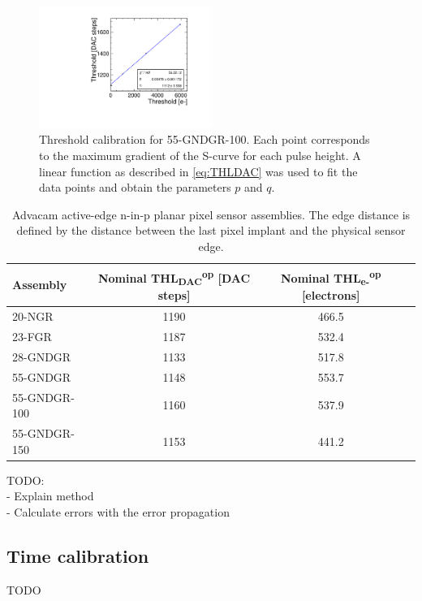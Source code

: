 \begin{figure}[htbp]
  \centering
  \includegraphics[width=0.5\textwidth]{./figures/Calibration/THLcalibration_W0005_E02.pdf}
  \caption{Threshold calibration for 55-GNDGR-100. Each point
    corresponds to the maximum gradient of the S-curve for each pulse
    height. A linear function as described in \cref{eq:THLDAC} was
    used to fit the data points and obtain the parameters $p$ and $q$.}
  \label{fig:THLcalib_55-GNDGR-100}
\end{figure}

\begin{table}[htbp]
  \centering
  \caption{Advacam active-edge n-in-p planar pixel sensor assemblies. The edge distance is defined by the distance between the last pixel implant and the physical sensor edge.}
  \label{tab:NominalThreshold}
  \begin{tabular}{lccc}
    \toprule
    Assembly & Nominal THL\textsubscript{DAC}\textsuperscript{op} [DAC steps] & Nominal THL\textsubscript{e-}\textsuperscript{op} [electrons]\\
    \midrule
    20-NGR & 1190 & 466.5\\
    23-FGR & 1187 & 532.4\\ \hline
    28-GNDGR & 1133 & 517.8\\
    55-GNDGR & 1148 & 553.7\\
    55-GNDGR-100 & 1160 & 537.9\\ \hline
    55-GNDGR-150 & 1153 & 441.2\\
    \bottomrule
  \end{tabular}
\end{table}


TODO:\\ 
- Explain method\\
- Calculate errors with the error propagation\\





\subsection{Time calibration} \label{sec:TOA_calibration}
TODO

